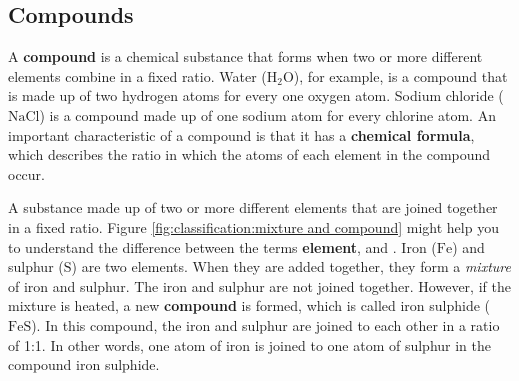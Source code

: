             \subsection*{Compounds}
            \nopagebreak
        \label{m38708*id63363}A \textbf{compound} is a chemical substance that forms when two or more different elements combine in a fixed ratio. Water ($\mathrm{H}{}_{2}\mathrm{O}$), for example, is a compound that is made up of two hydrogen atoms for every one oxygen atom. Sodium chloride ($\mathrm{NaCl}$) is a compound made up of one sodium atom for every chlorine atom. An important characteristic of a compound is that it has a \textbf{chemical formula}, which describes the ratio in which the atoms of each element in the compound occur.\par 
\label{m38708*fhsst!!!underscore!!!id201}
 { \label{m38708*meaningfhsst!!!underscore!!!id201}
        A substance made up of two or more different elements that are joined together in a fixed ratio.
         } 
        \label{m38708*id63410} Figure \ref{fig:classification:mixture and compound} might help you to understand the difference between the terms \textbf{element},  and . Iron ($\mathrm{Fe}$) and sulphur ($\mathrm{S}$) are two elements. When they are added together, they form a \textsl{mixture} of iron and sulphur. The iron and sulphur are not joined together. However, if the mixture is heated, a new \textbf{compound} is formed, which is called iron sulphide ($\mathrm{FeS}$). In this compound, the iron and sulphur are joined to each other in a ratio of 1:1. In other words, one atom of iron is joined to one atom of sulphur in the compound iron sulphide.\par 
    \setcounter{subfigure}{0}

